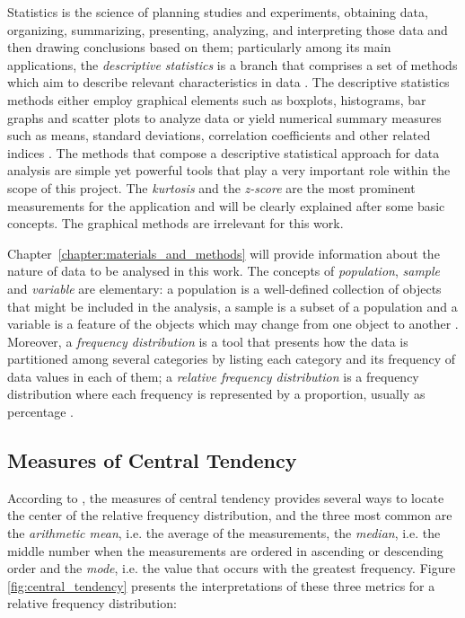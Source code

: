 Statistics is the science of planning studies and experiments, obtaining data, organizing, summarizing, presenting, analyzing, and interpreting those data and then drawing conclusions based on them; particularly among its main applications, the \emph{descriptive statistics} is a branch that comprises a set of methods which aim to describe relevant characteristics in data \cite{triola2017elementary}. The descriptive statistics methods either employ graphical elements such as boxplots, histograms, bar graphs and scatter plots to analyze data or yield numerical summary measures such as means, standard deviations, correlation coefficients and other related indices \cite{devore2011probability}. The methods that compose a descriptive statistical approach for data analysis are simple yet powerful tools that play a very important role within the scope of this project. The \emph{kurtosis} and the \emph{z-score} are the most prominent measurements for the application and will be clearly explained after some basic concepts. The graphical methods are irrelevant for this work.

Chapter~\ref{chapter:materials_and_methods} will provide information about the nature of data to be analysed in this work. The concepts of \emph{population}, \emph{sample} and \emph{variable} are elementary: a population is a well-defined collection of objects that might be included in the analysis, a sample is a subset of a population and a variable is a feature of the objects which may change from one object to another \cite{devore2011probability}. Moreover, a \emph{frequency distribution} is a tool that presents how the data is partitioned among several categories by listing each category and its frequency of data values in each of them; a \emph{relative frequency distribution} is a frequency distribution where each frequency is represented by a proportion, usually as percentage \cite{triola2017elementary}.

\subsection{Measures of Central Tendency}

According to , the measures of central tendency provides several ways to locate the center of the relative frequency distribution, and the three most common are the \emph{arithmetic mean}, i.e. the average of the measurements, the \emph{median}, i.e. the middle number when the measurements are ordered in ascending or descending order and the \emph{mode}, i.e. the value that occurs with the greatest frequency. Figure \ref{fig:central_tendency} presents the interpretations of these three metrics for a relative frequency distribution:

